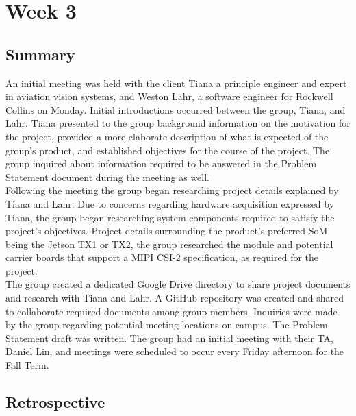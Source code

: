 \documentclass[letterpaper,10pt,serif,draftclsnofoot,onecolumn,compsoc,titlepage]{IEEEtran}
\begin{document}
\section{Week 3}

\subsection{Summary}

An initial meeting was held with the client Tiana a principle engineer and expert 
in aviation vision systems, and Weston Lahr, a software engineer 
for Rockwell Collins on Monday. Initial introductions occurred between the group, 
Tiana, and Lahr. 
Tiana presented to the group background information on the motivation for the project, 
provided a more elaborate description of what is expected of the group's product, and 
established objectives for the course of the project. The group inquired about 
information required to be answered in the Problem Statement document during the meeting 
as well. \\

Following the meeting the group began researching project details explained by Tiana 
and Lahr. Due to concerns regarding hardware acquisition expressed by Tiana, the group 
began researching system components required to satisfy the project's objectives. 
Project details surrounding the product's preferred SoM being the Jetson TX1 or TX2, 
the group researched the module and potential carrier boards that support a MIPI 
CSI-2 specification, as required for the project. \\

The group created a dedicated Google Drive directory to share project documents and 
research with Tiana and Lahr. A GitHub repository was created and shared to 
collaborate required documents among group members. 
Inquiries were made by the group regarding potential meeting locations on campus.
The Problem Statement draft was 
written. The group had an initial meeting with their TA, Daniel Lin, and meetings 
were scheduled to occur every Friday afternoon for the Fall Term.\\

\subsection{Retrospective}
\end{document}

